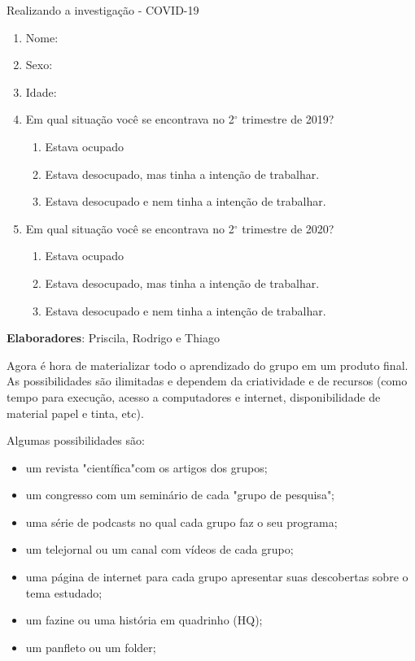 \begin{example}{Realizando a investigação - COVID-19}
\begin{center}
{{	\begin{enumerate}[label=\textbf{\arabic*. }, itemsep=0cm]
	\item Nome:
	\item Sexo:
	\item Idade:
	\item Em qual situação você se encontrava no 2$^{\circ}$ trimestre de 2019?
	\begin{enumerate}[label=(\alph*)]
	\item Estava ocupado
	\item Estava desocupado, mas tinha a intenção de trabalhar.
	\item Estava desocupado e nem tinha a intenção de trabalhar.
	\end{enumerate}
	\item Em qual situação você se encontrava no 2$^{\circ}$ trimestre de 2020?
	\begin{enumerate}
	\item Estava ocupado
	\item Estava desocupado, mas tinha a intenção de trabalhar.
	\item Estava desocupado e nem tinha a intenção de trabalhar.
	\end{enumerate}
	\end{enumerate}
	\flushright

	\textbf{Elaboradores}: Priscila, Rodrigo e Thiago
	\vspace{.5em}
	}

}
\end{center}
\end{example}
\clearpage
{}
\label{etapa5}

Agora é hora de materializar todo o aprendizado do grupo em um produto final. As possibilidades são ilimitadas e dependem da criatividade e de recursos (como tempo para execução, acesso a computadores e internet, disponibilidade de material papel e tinta, etc). 

Algumas possibilidades são:

\begin{itemize}
\item um revista "científica"{}com os artigos dos grupos;
\item um congresso com um seminário de cada "grupo de pesquisa";
\item uma série de podcasts no qual cada grupo faz o seu programa;
\item um telejornal ou um canal com vídeos de cada grupo;
\item uma página de internet para cada grupo apresentar suas descobertas sobre o tema estudado;
\item um fazine ou uma história em quadrinho (HQ);
\item um panfleto ou um folder;
\end{itemize}

